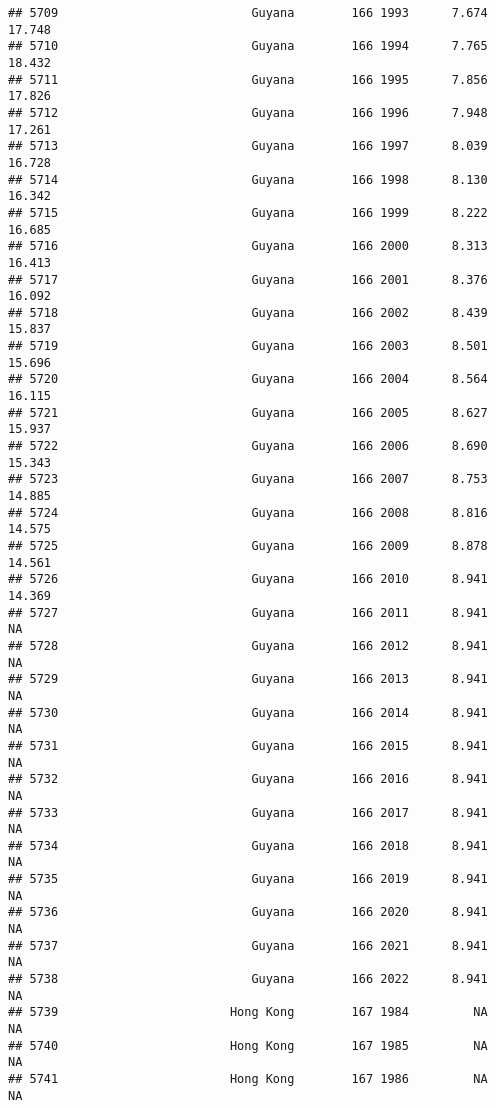\documentclass[
]{article}
\begin{document}
\begin{verbatim}
## 5709                           Guyana        166 1993      7.674     17.748
## 5710                           Guyana        166 1994      7.765     18.432
## 5711                           Guyana        166 1995      7.856     17.826
## 5712                           Guyana        166 1996      7.948     17.261
## 5713                           Guyana        166 1997      8.039     16.728
## 5714                           Guyana        166 1998      8.130     16.342
## 5715                           Guyana        166 1999      8.222     16.685
## 5716                           Guyana        166 2000      8.313     16.413
## 5717                           Guyana        166 2001      8.376     16.092
## 5718                           Guyana        166 2002      8.439     15.837
## 5719                           Guyana        166 2003      8.501     15.696
## 5720                           Guyana        166 2004      8.564     16.115
## 5721                           Guyana        166 2005      8.627     15.937
## 5722                           Guyana        166 2006      8.690     15.343
## 5723                           Guyana        166 2007      8.753     14.885
## 5724                           Guyana        166 2008      8.816     14.575
## 5725                           Guyana        166 2009      8.878     14.561
## 5726                           Guyana        166 2010      8.941     14.369
## 5727                           Guyana        166 2011      8.941         NA
## 5728                           Guyana        166 2012      8.941         NA
## 5729                           Guyana        166 2013      8.941         NA
## 5730                           Guyana        166 2014      8.941         NA
## 5731                           Guyana        166 2015      8.941         NA
## 5732                           Guyana        166 2016      8.941         NA
## 5733                           Guyana        166 2017      8.941         NA
## 5734                           Guyana        166 2018      8.941         NA
## 5735                           Guyana        166 2019      8.941         NA
## 5736                           Guyana        166 2020      8.941         NA
## 5737                           Guyana        166 2021      8.941         NA
## 5738                           Guyana        166 2022      8.941         NA
## 5739                        Hong Kong        167 1984         NA         NA
## 5740                        Hong Kong        167 1985         NA         NA
## 5741                        Hong Kong        167 1986         NA         NA

\end{verbatim}
\end{document}
